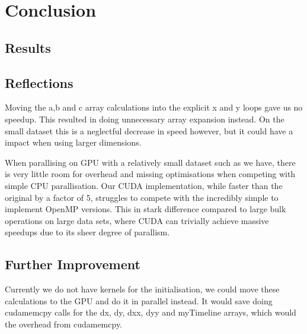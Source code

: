 \section{Conclusion}
\subsection{Results}
\subsection{Reflections}
Moving the a,b and c array calculations into the explicit x and y loops gave us no speedup. This resulted in doing unnecessary  array expansion instead. On the small dataset this is a neglectful decrease in speed however, but it could have a impact when using larger dimensions.

When parallising on GPU with a relatively small dataset such as we have, there is very little room for overhead and missing optimisations
 when competing
 with simple CPU parallisation. Our CUDA implementation, while faster than the original by a factor of 5, struggles to compete with the
 incredibly simple to implement OpenMP versions. This in stark difference compared to large bulk operations on large data sets,
 where CUDA can
 trivially achieve massive speedups due to its sheer degree of parallism.

\subsection{Further Improvement}
Currently we do not have kernels for the initialisation, we could move these calculations to the GPU and do it in parallel instead. It would save doing cudamemcpy calls for the dx, dy, dxx, dyy and myTimeline arrays, which would the overhead from cudamemcpy.